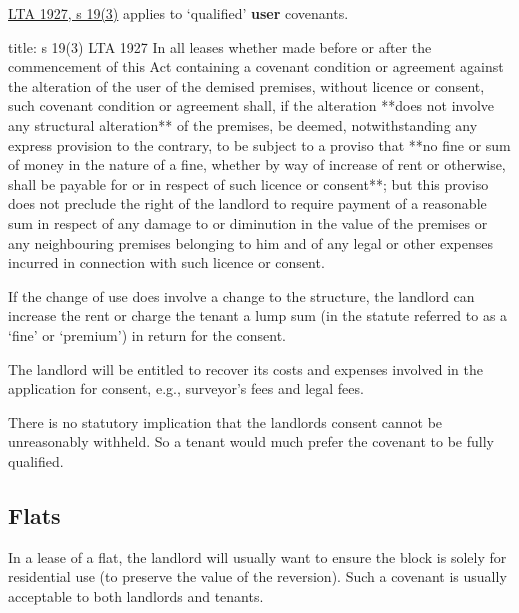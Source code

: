 \documentclass[
]{article}
\newenvironment{Shaded}{}{}
\newcommand{\NormalTok}[1]{#1}
\begin{document}
\href{https://www.legislation.gov.uk/ukpga/Geo5/17-18/36/section/19}{LTA
1927, s 19(3)} applies to `qualified' \textbf{user} covenants.

\begin{Shaded}
\begin{Highlighting}[]
\NormalTok{title: s 19(3) LTA 1927}
\NormalTok{In all leases whether made before or after the commencement of this Act containing a covenant condition or agreement against the alteration of the user of the demised premises, without licence or consent, such covenant condition or agreement shall, if the alteration **does not involve any structural alteration** of the premises, be deemed, notwithstanding any express provision to the contrary, to be subject to a proviso that **no fine or sum of money in the nature of a fine, whether by way of increase of rent or otherwise, shall be payable for or in respect of such licence or consent**; but this proviso does not preclude the right of the landlord to require payment of a reasonable sum in respect of any damage to or diminution in the value of the premises or any neighbouring premises belonging to him and of any legal or other expenses incurred in connection with such licence or consent. }
\end{Highlighting}
\end{Shaded}

If the change of use does involve a change to the structure, the
landlord can increase the rent or charge the tenant a lump sum (in the
statute referred to as a `fine' or `premium') in return for the consent.

The landlord will be entitled to recover its costs and expenses involved
in the application for consent, e.g., surveyor's fees and legal fees.

\begin{Shaded}
\begin{Highlighting}[]
\NormalTok{There is no statutory implication that the landlord\textquotesingle{}s consent cannot be unreasonably withheld. So a tenant would much prefer the covenant to be fully qualified. }
\end{Highlighting}
\end{Shaded}

\hypertarget{flats}{%
\subsection{Flats}\label{flats}}

In a lease of a flat, the landlord will usually want to ensure the block
is solely for residential use (to preserve the value of the reversion).
Such a covenant is usually acceptable to both landlords and tenants.
\end{document}
